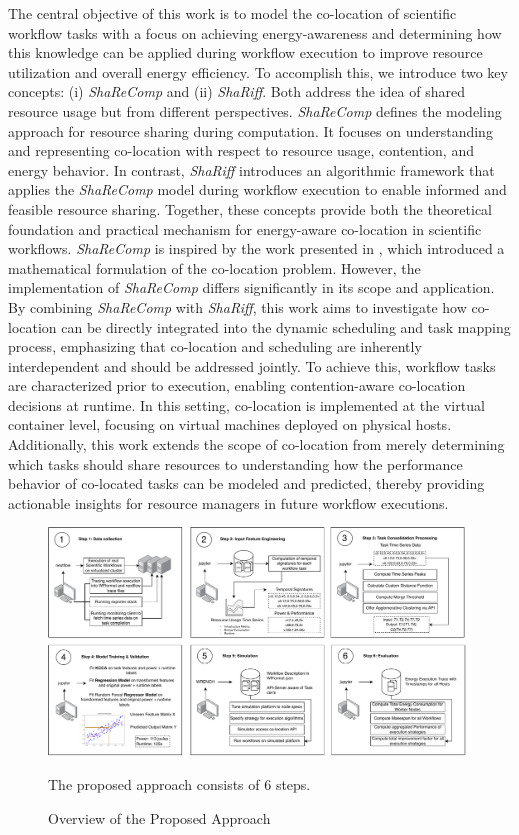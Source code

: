 The central objective of this work is to model the co-location of scientific workflow tasks with a focus on achieving energy-awareness and determining how this knowledge can be applied during workflow execution to improve resource utilization and overall energy efficiency. To accomplish this, we introduce two key concepts: (i) \textit{ShaReComp} and (ii) \textit{ShaRiff}. Both address the idea of shared resource usage but from different perspectives. \textit{ShaReComp} defines the modeling approach for resource sharing during computation. It focuses on understanding and representing co-location with respect to resource usage, contention, and energy behavior. In contrast, \textit{ShaRiff} introduces an algorithmic framework that applies the \textit{ShaReComp} model during workflow execution to enable informed and feasible resource sharing. Together, these concepts provide both the theoretical foundation and practical mechanism for energy-aware co-location in scientific workflows.
\textit{ShaReComp} is inspired by the work presented in \cite{5644899}, which introduced a mathematical formulation of the co-location problem. However, the implementation of \textit{ShaReComp} differs significantly in its scope and application. By combining \textit{ShaReComp} with \textit{ShaRiff}, this work aims to investigate how co-location can be directly integrated into the dynamic scheduling and task mapping process, emphasizing that co-location and scheduling are inherently interdependent and should be addressed jointly. To achieve this, workflow tasks are characterized prior to execution, enabling contention-aware co-location decisions at runtime. In this setting, co-location is implemented at the virtual container level, focusing on virtual machines deployed on physical hosts. Additionally, this work extends the scope of co-location from merely determining which tasks should share resources to understanding how the performance behavior of co-located tasks can be modeled and predicted, thereby providing actionable insights for resource managers in future workflow executions.

\begin{figure}[H]
    \centering
    \includegraphics[scale=0.45]{fig/04/04-overview.pdf}
    \small
    \caption{Overview of the Proposed Approach}
    \label{fig:04-overview}
    \tiny
    The proposed approach consists of 6 steps.
\end{figure}

